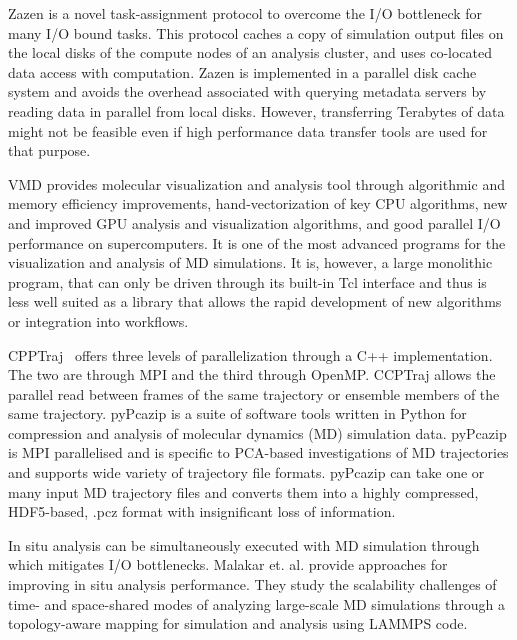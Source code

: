 Zazen \cite{Zazen} is a novel task-assignment protocol to overcome the I/O bottleneck for many I/O bound tasks. This protocol caches a copy of simulation output files on the local disks of the compute nodes of an analysis cluster, and uses co-located data access with computation. 
Zazen is implemented in a parallel disk cache system and avoids the overhead associated with querying metadata servers by reading data in parallel from local disks.
However, transferring Terabytes of data might not be feasible even if high performance data transfer tools are used for that purpose.

VMD \cite{Hum96, VMD2013}  provides molecular visualization and analysis tool through algorithmic and memory efficiency improvements, hand-vectorization of key CPU algorithms, new and improved GPU analysis and visualization algorithms, and good parallel I/O performance on supercomputers. It is one of the most advanced programs for the visualization and analysis of MD simulations. It is, however, a large monolithic program, that can only be driven through its built-in Tcl interface and thus is less well suited as a library that allows the rapid development of new algorithms or integration into workflows.

CPPTraj~\cite{cpptraj-2013} offers three levels of parallelization through a C++ implementation. The two are through MPI and the third through OpenMP.
CCPTraj allows the parallel read between frames of the same trajectory or ensemble members of the same trajectory. 
pyPcazip \cite{pyPcazip} is a suite of software tools written in Python for compression and analysis of molecular dynamics (MD) simulation data. 
pyPcazip is MPI parallelised and is specific to PCA-based investigations of MD trajectories and supports wide variety of trajectory file formats.
pyPcazip can take one or many input MD trajectory files and converts them into a highly compressed, HDF5-based, .pcz format with insignificant loss of information.

In situ analysis can be simultaneously executed with MD simulation through which mitigates I/O bottlenecks.
Malakar et. al. \cite{Malakar-etal} provide approaches for improving in situ analysis performance. 
They study the scalability challenges of time- and space-shared modes of analyzing large-scale MD simulations through a topology-aware mapping for simulation and analysis using LAMMPS code.


